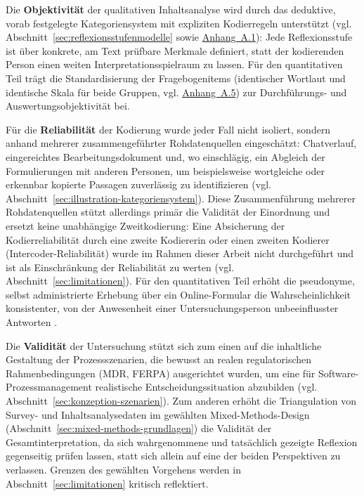Die \textbf{Objektivität} der qualitativen Inhaltsanalyse wird durch das deduktive, vorab
festgelegte Kategoriensystem mit expliziten Kodierregeln unterstützt \cite{mayringQualitativeInhaltsanalyse2019}
(vgl. Abschnitt~\ref{sec:reflexionsstufenmodelle} sowie \hyperref[app:kategoriensystem]{Anhang~A.1}): Jede Reflexionsstufe ist über
konkrete, am Text prüfbare Merkmale definiert, statt der kodierenden Person einen weiten
Interpretationsspielraum zu lassen. Für den quantitativen Teil trägt die Standardisierung der
Fragebogenitems (identischer Wortlaut und identische Skala für beide Gruppen, vgl. \hyperref[app:fragebogen]{Anhang~A.5}) zur
Durchführungs- und Auswertungsobjektivität bei.

Für die \textbf{Reliabilität} der Kodierung wurde jeder Fall nicht isoliert, sondern anhand mehrerer
zusammengeführter Rohdatenquellen eingeschätzt: Chatverlauf, eingereichtes Bearbeitungsdokument und,
wo einschlägig, ein Abgleich der Formulierungen mit anderen Personen, um beispielsweise wortgleiche
oder erkennbar kopierte Passagen zuverlässig zu identifizieren (vgl.
Abschnitt~\ref{sec:illustration-kategoriensystem}). Diese Zusammenführung mehrerer Rohdatenquellen
stützt allerdings primär die Validität der Einordnung und ersetzt keine unabhängige Zweitkodierung:
Eine Absicherung der Kodierreliabilität durch eine zweite Kodiererin oder einen zweiten Kodierer
(Intercoder-Reliabilität) wurde im Rahmen dieser Arbeit nicht durchgeführt und ist als Einschränkung
der Reliabilität zu werten (vgl. Abschnitt~\ref{sec:limitationen}). Für den quantitativen Teil erhöht die
pseudonyme, selbst administrierte Erhebung über ein Online-Formular die Wahrscheinlichkeit konsistenter, von der
Anwesenheit einer Untersuchungsperson unbeeinflusster Antworten \cite{doeringForschungsmethodenEvaluationSozial2023}.

Die \textbf{Validität} der Untersuchung stützt sich zum einen auf die inhaltliche Gestaltung der
Prozessszenarien, die bewusst an realen regulatorischen Rahmenbedingungen (MDR, FERPA) ausgerichtet
wurden, um eine für Software-Prozessmanagement realistische Entscheidungssituation abzubilden (vgl.
Abschnitt~\ref{sec:konzeption-szenarien}). Zum anderen erhöht die Triangulation von
Survey- und Inhaltsanalysedaten im gewählten Mixed-Methods-Design
(Abschnitt~\ref{sec:mixed-methods-grundlagen}) die Validität der Gesamtinterpretation, da sich
wahrgenommene und tatsächlich gezeigte Reflexion gegenseitig prüfen lassen, statt sich allein auf
eine der beiden Perspektiven zu verlassen. Grenzen des gewählten Vorgehens werden in
Abschnitt~\ref{sec:limitationen} kritisch reflektiert.

